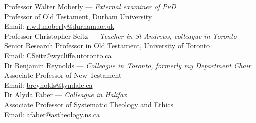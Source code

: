 \documentclass[10pt]{article}
\begin{document}
Professor Walter Moberly --- \emph{External examiner of \textsc{PhD}}\\
Professor of Old Testament, Durham University\\
Email: \href{mailto:r.w.l.moberly@durham.ac.uk}{r.w.l.moberly@durham.ac.uk}\\

Professor Christopher Seitz --- \emph{Teacher in St Andrews, colleague in Toronto}\\
Senior Research Professor in Old Testament, University of Toronto\\
Email: \href{mailto:CSeitz@wycliffe.utoronto.ca}{CSeitz@wycliffe.utoronto.ca}\\


Dr Benjamin Reynolds --- \emph{Colleague in Toronto, formerly my Department Chair}\\
Associate Professor of New Testament\\
Email: \href{mailto:breynolds@tyndale.ca}{breynolds@tyndale.ca}\\

Dr Alyda Faber --- \emph{Colleague in Halifax}\\
Associate Professor of Systematic Theology and Ethics\\
Email: \href{mailto:afaber@astheology.ns.ca}{afaber@astheology.ns.ca}\\
\end{document}
